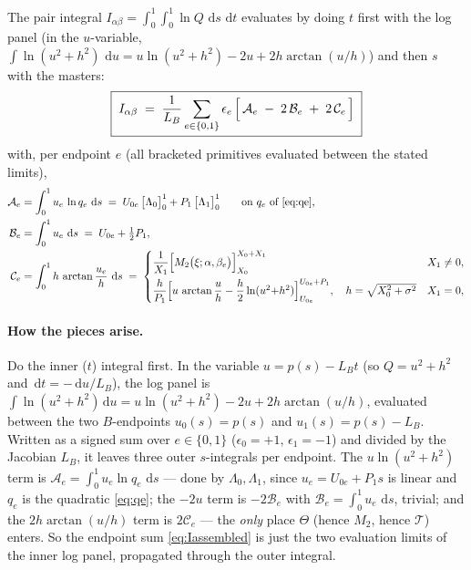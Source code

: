 \documentclass[11pt]{article}
\newcommand{\atan}{\operatorname{arctan}}
\newcommand{\dd}{\,\mathrm{d}}
\begin{document}
The pair integral $I_{\alpha\beta}=\int_0^1\!\int_0^1\ln Q\,\dd s\,\dd t$ evaluates
by doing $t$ first with the log panel (in the $u$-variable,
$\int\!\ln(u^2+h^2)\,\dd u = u\ln(u^2+h^2)-2u+2h\atan(u/h)$) and then $s$ with the
masters:
\begin{equation}
  \boxed{\;
  I_{\alpha\beta} \;=\; \frac{1}{L_B}\sum_{e\in\{0,1\}} \epsilon_e\,
  \Bigl[\,\mathcal A_e \;-\; 2\,\mathcal B_e \;+\; 2\,\mathcal C_e\,\Bigr]\;}
  \label{eq:Iassembled}
\end{equation}
with, per endpoint $e$ (all bracketed primitives evaluated between the stated
limits),
\begin{align}
  \mathcal A_e &= \int_0^1 u_e\,\ln q_e\,\dd s
   \;=\; U_{0e}\,\bigl[\Lambda_0\bigr]_0^1+P_1\,\bigl[\Lambda_1\bigr]_0^1
   \qquad\text{on } q_e \text{ of \eqref{eq:qe}},
  \\
  \mathcal B_e &= \int_0^1 u_e\,\dd s \;=\; U_{0e}+\tfrac12 P_1 ,
  \\
  \mathcal C_e &= \int_0^1 h\,\atan\frac{u_e}{h}\,\dd s
   \;=\;
   \begin{cases}
     \dfrac{1}{X_1}\Bigl[M_2\bigl(\xi;\alpha,\beta_e\bigr)\Bigr]_{X_0}^{X_0+X_1}
       & X_1\neq0,\\[8pt]
     \dfrac{h}{P_1}\Bigl[u\,\atan\dfrac{u}{h}-\dfrac{h}{2}\ln(u^2{+}h^2)
       \Bigr]_{U_{0e}}^{U_{0e}+P_1},\quad h=\sqrt{X_0^2+\sigma^2}
       & X_1=0 ,
   \end{cases}
  \label{eq:Ce}
\end{align}

\paragraph{How the pieces arise.}  Do the inner ($t$) integral first.  In the
variable $u=p(s)-L_B t$ (so $Q=u^2+h^2$ and $\dd t=-\dd u/L_B$), the log panel is
$\int\ln(u^2+h^2)\dd u=u\ln(u^2+h^2)-2u+2h\atan(u/h)$, evaluated between the two
$B$-endpoints $u_0(s)=p(s)$ and $u_1(s)=p(s)-L_B$.  Written as a signed sum over
$e\in\{0,1\}$ ($\epsilon_0{=}{+}1$, $\epsilon_1{=}{-}1$) and divided by the Jacobian
$L_B$, it leaves three outer $s$-integrals per endpoint.  The $u\ln(u^2+h^2)$ term is
$\mathcal A_e=\int_0^1 u_e\ln q_e\,\dd s$ --- done by $\Lambda_0,\Lambda_1$, since
$u_e=U_{0e}+P_1s$ is linear and $q_e$ is the quadratic \eqref{eq:qe}; the $-2u$ term is
$-2\mathcal B_e$ with $\mathcal B_e=\int_0^1 u_e\,\dd s$, trivial; and the
$2h\atan(u/h)$ term is $2\mathcal C_e$ --- the \emph{only} place $\Theta$ (hence $M_2$,
hence $\mathcal T$) enters.  So the endpoint sum \eqref{eq:Iassembled} is just the two
evaluation limits of the inner log panel, propagated through the outer integral.
\end{document}
